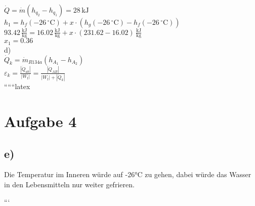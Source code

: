 $\dot{Q} = \dot{m} (h_{q_2} - h_{q_1}) = 28 \, \text{kJ}$ \\

$h_1 = h_f (-26 \, ^\circ \text{C}) + x \cdot (h_g (-26 \, ^\circ \text{C}) - h_f (-26 \, ^\circ \text{C}))$ \\

$93.42 \, \frac{\text{kJ}}{\text{kg}} = 16.02 \, \frac{\text{kJ}}{\text{kg}} + x \cdot (231.62 - 16.02) \, \frac{\text{kJ}}{\text{kg}}$ \\

$x_1 = 0.36$ \\

d) \\
$\dot{Q}_k = \dot{m}_{R134a} (h_{A_1} - h_{A_2})$ \\

$\varepsilon_k = \frac{|\dot{Q}_{ab}|}{|W_t|} = \frac{|\dot{Q}_{AB}|}{|W_t| + |\dot{Q}_k|}$ \\

``````latex


\section*{Aufgabe 4}

\subsection*{e)}
Die Temperatur im Inneren würde auf -26°C zu gehen, dabei würde das Wasser in den Lebensmitteln nur weiter gefrieren.

```